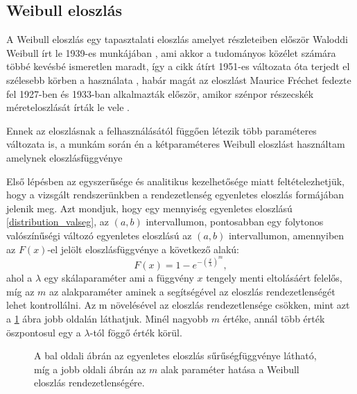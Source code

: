 \subsection{Weibull eloszlás}

A Weibull eloszlás egy tapasztalati eloszlás amelyet részleteiben először Waloddi Weibull írt le 1939-es munkájában \cite{distributions_weibull1939}, ami akkor a tudományos közélet számára többé kevésbé ismeretlen maradt, így a cikk átírt 1951-es változata óta terjedt el szélesebb körben a használata \cite{distributions_weibull1951}, habár magát az eloszlást Maurice Fréchet fedezte fel 1927-ben \cite{distributions_weibull_frechet1927} és 1933-ban alkalmazták először, amikor szénpor  részecskék méreteloszlását írták le vele \cite{distributions_weibull_rosin1933}. 

Ennek az eloszlásnak a felhasználásától függően létezik több paraméteres változata is, a munkám során én a kétparaméteres Weibull eloszlást használtam amelynek eloszlásfüggvénye

Első lépésben az egyszerűsége és analitikus kezelhetősége miatt feltételezhetjük, hogy a vizsgált rendszerünkben a rendezetlenség egyenletes eloszlás formájában jelenik meg. 
Azt mondjuk, hogy egy mennyiség egyenletes eloszlású \ref{distribution_valseg}, az $(a,b)$ intervallumon, pontosabban egy folytonos valószínűségi változó egyenletes eloszlású az $(a,b)$ intervallumon, amennyiben az $F(x)$-el jelölt eloszlásfüggvénye a következő alakú:
\begin{equation}
	F(x)= 1 - e^{-(\frac{x}{\lambda})^m},
\end{equation}
ahol a $\lambda$ egy skálaparaméter ami a függvény $x$ tengely menti eltolásáért felelős, míg az $m$ az alakparaméter aminek a segítségével az eloszlás rendezetlenségét lehet kontrollálni. Az m növelésével az eloszlás rendezetlensége csökken, mint azt a \ref{fig:unif_weib_distrib} ábra jobb oldalán láthatjuk. Minél nagyobb $m$ értéke, annál több érték öszpontosul egy a $\lambda$-tól föggő érték körül.
\begin{figure}
\label{fig:unif_weib_distrib}
\caption{A bal oldali ábrán az egyenletes eloszlás sűrűségfüggvénye látható, míg a jobb oldali ábrán az $m$ alak paraméter hatása a Weibull eloszlás rendezetlenségére.}
\centering
{}
\end{figure}

		
